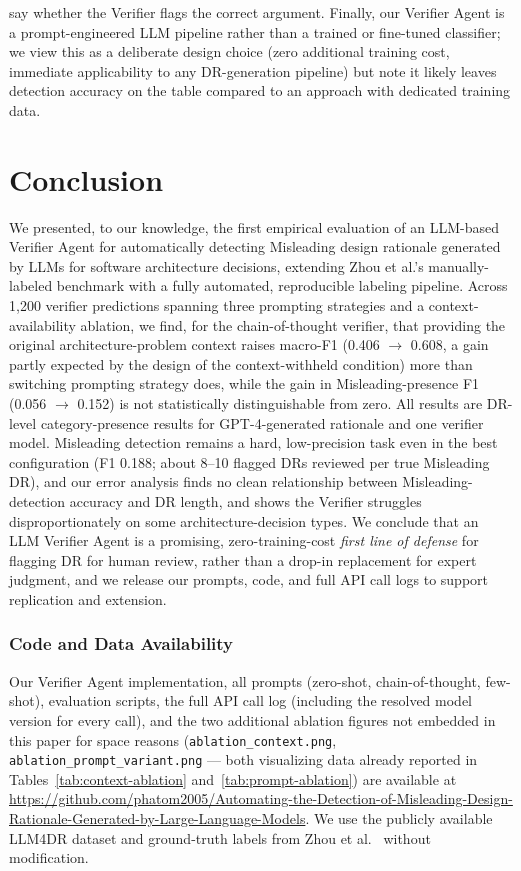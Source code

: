 \documentclass[runningheads]{llncs}
\begin{document}
say whether the Verifier flags the correct argument. Finally, our Verifier Agent is a prompt-engineered LLM pipeline rather than a trained or fine-tuned classifier; we view this as a deliberate design choice (zero additional training cost, immediate applicability to any DR-generation pipeline) but note it likely leaves detection accuracy on the table compared to an approach with dedicated training data.


\section{Conclusion}
\label{sec:conclusion}

We presented, to our knowledge, the first empirical evaluation of an LLM-based Verifier Agent for automatically detecting Misleading design rationale generated by LLMs for software architecture decisions, extending Zhou et al.'s manually-labeled benchmark with a fully automated, reproducible labeling pipeline. Across 1{,}200 verifier predictions spanning three prompting strategies and a context-availability ablation, we find, for the chain-of-thought verifier, that providing the original architecture-problem context raises macro-F1 (0.406 $\rightarrow$ 0.608, a gain partly expected by the design of the context-withheld condition) more than switching prompting strategy does, while the gain in Misleading-presence F1 (0.056 $\rightarrow$ 0.152) is not statistically distinguishable from zero. All results are DR-level category-presence results for GPT-4-generated rationale and one verifier model. Misleading detection remains a hard, low-precision task even in the best configuration (F1 0.188; about 8--10 flagged DRs reviewed per true Misleading DR), and our error analysis finds no clean relationship between Misleading-detection accuracy and DR length, and shows the Verifier struggles disproportionately on some architecture-decision types. We conclude that an LLM Verifier Agent is a promising, zero-training-cost \emph{first line of defense} for flagging DR for human review, rather than a drop-in replacement for expert judgment, and we release our prompts, code, and full API call logs to support replication and extension.


\subsubsection*{Code and Data Availability}
Our Verifier Agent implementation, all prompts (zero-shot, chain-of-thought, few-shot), evaluation scripts, the full API call log (including the resolved model version for every call), and the two additional ablation figures not embedded in this paper for space reasons (\texttt{ablation\_context.png}, \texttt{ablation\_prompt\_variant.png} --- both visualizing data already reported in Tables~\ref{tab:context-ablation} and~\ref{tab:prompt-ablation}) are available at \url{https://github.com/phatom2005/Automating-the-Detection-of-Misleading-Design-Rationale-Generated-by-Large-Language-Models}. We use the publicly available LLM4DR dataset and ground-truth labels from Zhou et al.\ \cite{zhou2025llm} without modification.
\end{document}
